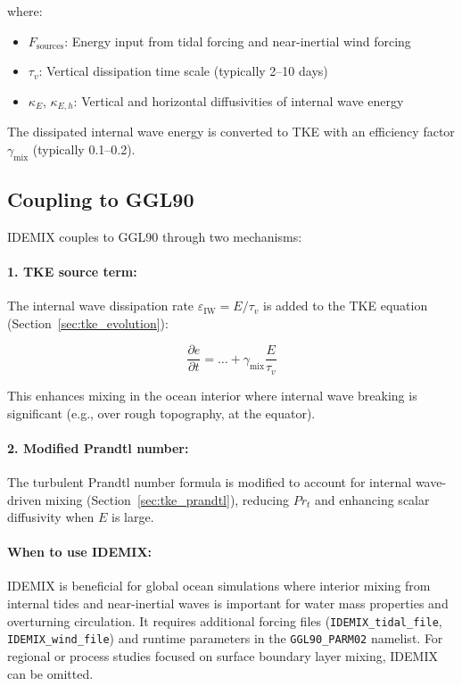 \documentclass[12pt,letterpaper]{article}
\begin{document}
where:
\begin{itemize}
\item $F_{\text{sources}}$: Energy input from tidal forcing and near-inertial wind forcing
\item $\tau_v$: Vertical dissipation time scale (typically 2--10 days)
\item $\kappa_E$, $\kappa_{E,h}$: Vertical and horizontal diffusivities of internal wave energy
\end{itemize}

The dissipated internal wave energy is converted to TKE with an efficiency factor $\gamma_{\text{mix}}$ (typically 0.1--0.2).

\subsection{Coupling to GGL90}

IDEMIX couples to GGL90 through two mechanisms:

\paragraph{1. TKE source term:} The internal wave dissipation rate $\varepsilon_{\text{IW}} = E / \tau_v$ is added to the TKE equation (Section~\ref{sec:tke_evolution}):

\begin{equation}
\frac{\partial e}{\partial t} = \ldots + \gamma_{\text{mix}} \frac{E}{\tau_v}
\end{equation}

This enhances mixing in the ocean interior where internal wave breaking is significant (e.g., over rough topography, at the equator).

\paragraph{2. Modified Prandtl number:} The turbulent Prandtl number formula is modified to account for internal wave-driven mixing (Section~\ref{sec:tke_prandtl}), reducing $Pr_t$ and enhancing scalar diffusivity when $E$ is large.

\paragraph{When to use IDEMIX:} IDEMIX is beneficial for global ocean simulations where interior mixing from internal tides and near-inertial waves is important for water mass properties and overturning circulation. It requires additional forcing files (\verb|IDEMIX_tidal_file|, \verb|IDEMIX_wind_file|) and runtime parameters in the \verb|GGL90_PARM02| namelist. For regional or process studies focused on surface boundary layer mixing, IDEMIX can be omitted.
\end{document}
